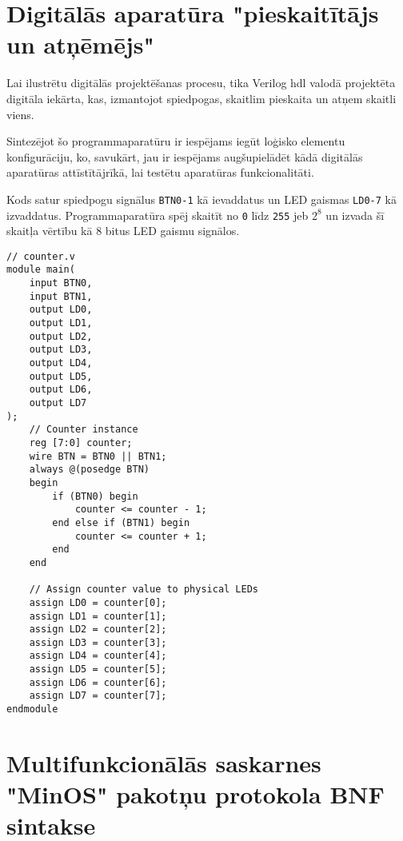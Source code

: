 \renewcommand{\thesection}{\arabic{section}}
\titleformat{\section}{\normalfont\large\bfseries}{\thesection. Pielikums.}{1em}{}

\section{Digitālās aparatūra "pieskaitītājs un atņēmējs"}
\label{att:counter}

Lai ilustrētu digitālās projektēšanas procesu, tika Verilog \gls{hdl} valodā
projektēta digitāla iekārta, kas, izmantojot spiedpogas, skaitlim pieskaita un
atņem skaitli viens.

Sintezējot šo programmaparatūru ir iespējams iegūt loģisko elementu
konfigurāciju, ko, savukārt, jau ir iespējams augšupielādēt kādā digitālās
aparatūras attīstītājrīkā, lai testētu aparatūras funkcionalitāti. 

Kods satur spiedpogu signālus \lstinline!BTN0-1! kā ievaddatus un LED gaismas
\lstinline!LD0-7! kā izvaddatus. Programmaparatūra spēj skaitīt no \lstinline!0!
līdz \lstinline!255! jeb \(2^8\) un izvada šī skaitļa vērtību kā 8 bitus LED
gaismu signālos.

\begin{lstlisting}
// counter.v
module main(
    input BTN0,
    input BTN1,
    output LD0,
    output LD1,
    output LD2,
    output LD3,
    output LD4,
    output LD5,
    output LD6,
    output LD7
);
    // Counter instance
    reg [7:0] counter;
    wire BTN = BTN0 || BTN1;
    always @(posedge BTN)
    begin
        if (BTN0) begin
            counter <= counter - 1;
        end else if (BTN1) begin
            counter <= counter + 1;
        end
    end

    // Assign counter value to physical LEDs
    assign LD0 = counter[0];
    assign LD1 = counter[1];
    assign LD2 = counter[2];
    assign LD3 = counter[3];
    assign LD4 = counter[4];
    assign LD5 = counter[5];
    assign LD6 = counter[6];
    assign LD7 = counter[7];
endmodule    
\end{lstlisting}
  
\section{Multifunkcionālās saskarnes "MinOS" pakotņu protokola BNF sintakse}
\label{att:minosbnf}

